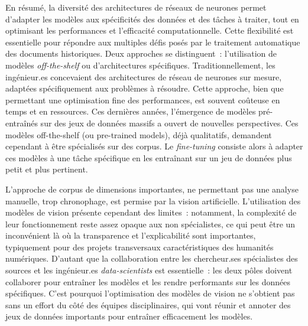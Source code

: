 \vspace{2cm}

En résumé, la diversité des architectures de réseaux de neurones permet
d'adapter les modèles aux spécificités des données et des tâches à
traiter, tout en optimisant les performances et l'efficacité
computationnelle. Cette flexibilité est essentielle pour répondre aux
multiples défis posés par le traitement automatique des documents
historiques. Deux approches se distinguent~: l'utilisation de modèles
\textit{off-the-shelf} ou d'architectures spécifiques. Traditionnellement, les
ingénieur.es concevaient des architectures de réseau de neurones sur
mesure, adaptées spécifiquement aux problèmes à résoudre. Cette
approche, bien que permettant une optimisation fine des performances,
est souvent coûteuse en temps et en ressources. Ces dernières années,
l'émergence de modèles pré-entraînés sur des jeux de données massifs a
ouvert de nouvelles perspectives. Ces modèles off-the-shelf (ou
pre-trained models), déjà qualitatifs, demandent cependant à être spécialisés sur des corpus. Le \textit{fine-tuning}
consiste alors à adapter ces modèles à une tâche spécifique en les
entraînant sur un jeu de données plus petit et plus pertinent.

L'approche de corpus de dimensions importantes, ne permettant pas une analyse
manuelle, trop chronophage, est permise par la vision artificielle.
L'utilisation des modèles de vision présente cependant des limites~:
notamment, la complexité de leur fonctionnement reste assez opaque aux
non spécialistes, ce qui peut être un inconvénient là où la transparence
et l'explicabilité sont importantes, typiquement pour des projets
transversaux caractéristiques des humanités numériques. D'autant que la
collaboration entre les chercheur.ses spécialistes des sources et les
ingénieur.es \textit{data-scientists} est essentielle~: les deux pôles doivent
collaborer pour entraîner les modèles et les rendre performants sur les
données spécifiques. C'est pourquoi l'optimisation des modèles de vision
ne s'obtient pas sans un effort du côté des équipes disciplinaires, qui
vont réunir et annoter des jeux de données importants pour entraîner
efficacement les modèles.